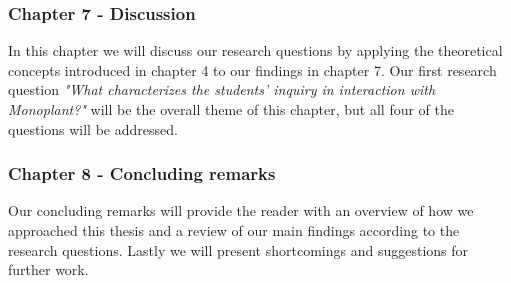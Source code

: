 \subsubsection*{Chapter 7 - Discussion}
In this chapter we will discuss our research questions by applying the theoretical concepts introduced in chapter 4 to our findings in chapter 7. Our first research question \emph{"What characterizes the students’ inquiry in interaction with Monoplant?"} will be the overall theme of this chapter, but all four of the questions will be addressed.

\subsubsection*{Chapter 8 - Concluding remarks}
Our concluding remarks will provide the reader with an overview of how we approached this thesis and a review of our main findings according to the research questions. Lastly we will present shortcomings and suggestions for further work.